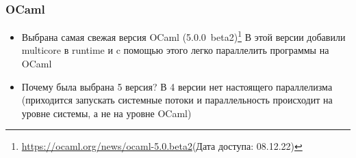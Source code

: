 \documentclass{beamer}
\begin{document}



\begin{frame}
  \frametitle{OCaml}
  \begin{itemize}
  \item Выбрана самая свежая версия OCaml (5.0.0~beta2)\footnote{\url{https://ocaml.org/news/ocaml-5.0.beta2}(Дата доступа: 08.12.22)}
  В этой версии добавили multicore в runtime и
  c помощью этого легко параллелить программы на OCaml
  \item Почему была выбрана 5 версия? В 4 версии нет настоящего параллелизма (приходится запускать системные потоки и параллельность происходит на уровне системы, а не на уровне OCaml)
  \end{itemize}
\end{frame}


\end{document}
